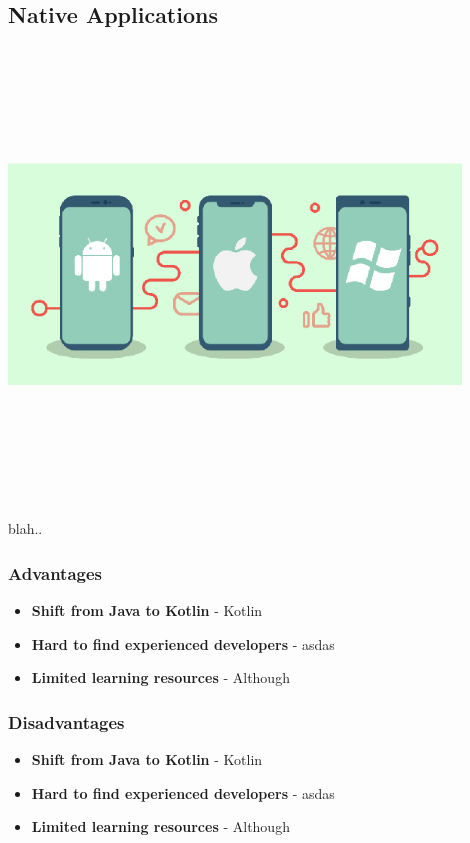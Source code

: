 \subsection{Native Applications}
\par
\medskip
\begin{center}
    \includegraphics[width=12cm,height=12cm,keepaspectratio]{Images/nativeapp2.png}
\end{center}

blah..


\subsubsection{Advantages}
\begin{itemize}
    \item \textbf{Shift from Java to Kotlin} - Kotlin
    \item \textbf{Hard to find experienced developers} - asdas
    \item \textbf{Limited learning resources} - Although
\end{itemize}
\subsubsection{Disadvantages}
\begin{itemize}
    \item \textbf{Shift from Java to Kotlin} - Kotlin
    \item \textbf{Hard to find experienced developers} - asdas
    \item \textbf{Limited learning resources} - Although
\end{itemize}

